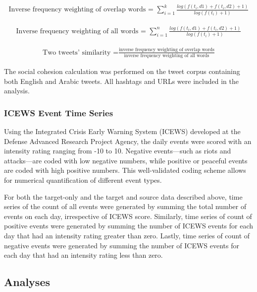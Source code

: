 \documentclass[
  english,
  man]{apa6}
\begin{document}
\begin{align}
\text{Inverse frequency weighting of overlap words = }\sum_{i=1}^k
\frac{log(f(t_i, d1) + f(t_i, d2) + 1)}{log(f(t_i) + 1)}
\end{align}

\begin{align}
\text{Inverse frequency weighting of all words = }\sum_{i=1}^n \frac{log(f(t_i,
d1) + f(t_i, d2) + 1)}{log(f(t_i) + 1)}
\end{align}

\begin{align}
\text{Two tweets' similarity =}\frac{\text{inverse frequency weighting of overlap
words}}{\text{inverse frequency weighting of all words}}
\end{align}

The social cohesion calculation was performed on the tweet corpus containing
both English and Arabic tweets. All hashtags and URLs were included in the
analysis.

\hypertarget{icews-event-time-series}{%
\subsubsection{ICEWS Event Time Series}\label{icews-event-time-series}}

Using the Integrated Crisis Early Warning System (ICEWS) developed at the
Defense Advanced Research Project Agency, the daily events were scored with an
intensity rating ranging from -10 to 10. Negative events---such as riots and
attacks---are coded with low negative numbers, while positive or peaceful events
are coded with high positive numbers. This well-validated coding scheme allows
for numerical quantification of different event types.

For both the target-only and the target and source data described above, time
series of the count of all events were generated by summing the total number of
events on each day, irrespective of ICEWS score. Similarly, time series of count
of positive events were generated by summing the number of ICEWS events for each
day that had an intensity rating greater than zero. Lastly, time series of count
of negative events were generated by summing the number of ICEWS events for each
day that had an intensity rating less than zero.

\hypertarget{analyses}{%
\subsection{Analyses}\label{analyses}}
\end{document}
